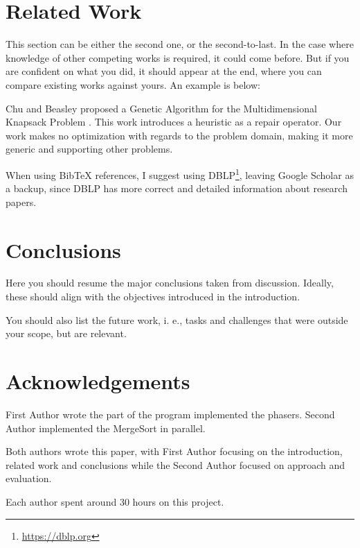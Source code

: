 \documentclass[runningheads]{llncs}
\begin{document}
\section{Related Work}

This section can be either the second one, or the second-to-last. In the case where knowledge of other competing works is required, it could come before. But if you are confident on what you did, it should appear at the end, where you can compare existing works against yours. An example is below:

Chu and Beasley proposed a Genetic Algorithm for the Multidimensional Knapsack Problem \cite{DBLP:journals/heuristics/ChuB98}. This work introduces a heuristic as a repair operator. Our work makes no optimization with regards to the problem domain, making it more generic and supporting other problems.


When using BibTeX references, I suggest using DBLP\footnote{\url{https://dblp.org}}, leaving Google Scholar as a backup, since DBLP has more correct and detailed information about research papers.

\section{Conclusions}

Here you should resume the major conclusions taken from discussion. Ideally, these should align with the objectives introduced in the introduction.


You should also list the future work, i. e., tasks and challenges that were outside your scope, but are relevant.

\section*{Acknowledgements}

First Author wrote the part of the program implemented the phasers. Second Author implemented the MergeSort in parallel. 

Both authors wrote this paper, with First Author focusing on the introduction, related work and conclusions while the Second Author focused on approach and evaluation.

Each author spent around 30 hours on this project.



\end{document}
